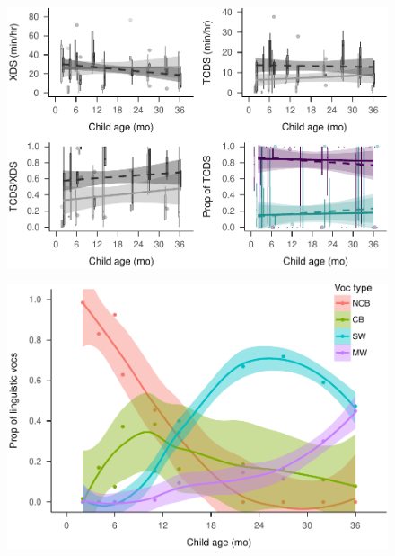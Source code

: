 \documentclass[man]{apa6}
\theoremstyle{definition}
\theoremstyle{definition}
\theoremstyle{definition}
\theoremstyle{remark}
\begin{document}
\begin{figure}
\centering
\includegraphics{Tseltal-CLE_files/figure-latex/plot_XDS_TDS_quantity_nonrandom-1.pdf}
\caption{}
\end{figure}

\begin{figure}
\centering
\includegraphics{Tseltal-CLE_files/figure-latex/plot_chi_voctypes_overall-1.pdf}
\caption{}
\end{figure}
\end{document}
